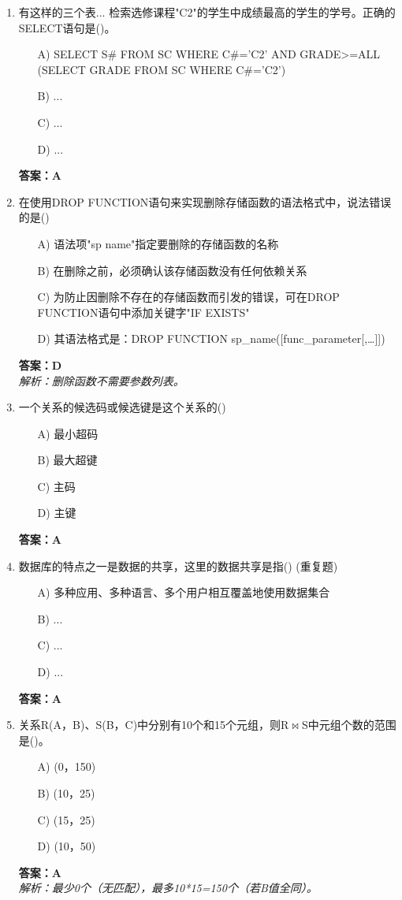 \documentclass[a4paper,12pt]{article}
\begin{document}
\begin{enumerate}[label=\arabic*.]
\item 有这样的三个表... 检索选修课程"C2"的学生中成绩最高的学生的学号。正确的SELECT语句是()。
\begin{itemize}
    \item[A)] SELECT S\# FROM SC WHERE C\#='C2' AND GRADE>=ALL (SELECT GRADE FROM SC WHERE C\#='C2')
    \item[B)] ...
    \item[C)] ...
    \item[D)] ...
\end{itemize}
\textbf{答案：A}

\item 在使用DROP FUNCTION语句来实现删除存储函数的语法格式中，说法错误的是()
\begin{itemize}
    \item[A)] 语法项"sp name"指定要删除的存储函数的名称
    \item[B)] 在删除之前，必须确认该存储函数没有任何依赖关系
    \item[C)] 为防止因删除不存在的存储函数而引发的错误，可在DROP FUNCTION语句中添加关键字"IF EXISTS"
    \item[D)] 其语法格式是：DROP FUNCTION sp\_name([func\_parameter[,\dots]])
\end{itemize}
\textbf{答案：D} \\
\textit{解析：删除函数不需要参数列表。}

\item 一个关系的候选码或候选键是这个关系的()
\begin{itemize}
    \item[A)] 最小超码
    \item[B)] 最大超键
    \item[C)] 主码
    \item[D)] 主键
\end{itemize}
\textbf{答案：A}

\item 数据库的特点之一是数据的共享，这里的数据共享是指() (重复题)
\begin{itemize}
    \item[A)] 多种应用、多种语言、多个用户相互覆盖地使用数据集合
    \item[B)] ...
    \item[C)] ...
    \item[D)] ...
\end{itemize}
\textbf{答案：A}

\item 关系R(A，B)、S(B，C)中分别有10个和15个元组，则R$\bowtie$S中元组个数的范围是()。
\begin{itemize}
    \item[A)] (0，150)
    \item[B)] (10，25)
    \item[C)] (15，25)
    \item[D)] (10，50)
\end{itemize}
\textbf{答案：A} \\
\textit{解析：最少0个（无匹配），最多10*15=150个（若B值全同）。}


\end{enumerate}
\end{document}
